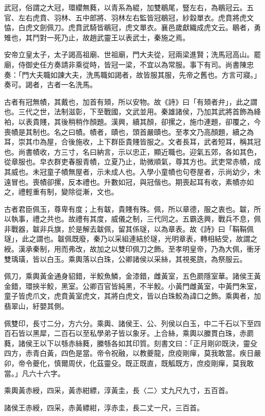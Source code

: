 \begin{pinyinscope}
武冠，俗謂之大冠，環纓無蕤，以青系為緄，加雙鶡尾，豎左右，為鶡冠云。五官、左右虎賁、羽林、五中郎將、羽林左右監皆冠鶡冠，紗縠單衣。虎賁將虎文恊，白虎文劍佩刀。虎賁武騎皆鶡冠，虎文單衣。襄邑歲獻織成虎文云。鶡者，勇雉也，其鬥對一死乃止，故趙武靈王以表武士，秦施之焉。

安帝立皇太子，太子謁高祖廟、世祖廟，門大夫從，冠兩梁進賢；洗馬冠高山。罷廟，侍御史任方奏請非乘從時，皆冠一梁，不宜以為常服。事下有司。尚書陳忠奏：「門大夫職如諫大夫，洗馬職如謁者，故皆服其服，先帝之舊也。方言可寢。」奏可。謁者，古者一名洗馬。

古者有冠無幘，其戴也，加首有頍，所以安物。故《詩》曰「有頍者弁」，此之謂也。三代之世，法制滋彰，下至戰國，文武並用。秦雄諸侯，乃加其武將首飾為絳袙，以表貴賤，其後稍稍作顏題。漢興，續其顏，卻摞之，施巾連題，卻覆之，今喪幘是其制也。名之曰幘。幘者，賾也，頭首嚴賾也。至孝文乃高顏題，續之為耳，崇其巾為屋，合後施收，上下群臣貴賤皆服之。文者長耳，武者短耳，稱其冠也。尚書幘收，方三寸，名曰納言，示以忠正，顯近職也。迎氣五郊，各如其色，從章服也。皁衣群吏春服青幘，立夏乃止，助微順氣，尊其方也。武吏常赤幘，成其威也。未冠童子幘無屋者，示未成人也。入學小童幘也句卷屋者，示尚幼少，未遠冒也。喪幘卻摞，反本禮也。升數如冠，與冠偕也。期喪起耳有收，素幘亦如之，禮輕重有制，變除從漸，文也。

古者君臣佩玉，尊卑有度；上有韍，貴賤有殊。佩，所以章德，服之衷也。韍，所以執事，禮之共也。故禮有其度，威儀之制，三代同之。五霸迭興，戰兵不息，佩非戰器，韍非兵旗，於是解去韍佩，留其係璲，以為章表。故《詩》曰「鞙鞙佩璲」，此之謂也。韍佩既廢，秦乃以采組連結於璲，光明章表，轉相結受，故謂之綬。漢承秦制，用而弗改，故加之以雙印佩刀之飾。至孝明皇帝，乃為大佩，衝牙雙瑀璜，皆以白玉。乘輿落以白珠，公卿諸侯以采絲，其視冕旒，為祭服云。

佩刀，乘輿黃金通身貂錯，半鮫魚鱗，金漆錯，雌黃室，五色罽隱室華。諸侯王黃金錯，環挾半鮫，黑室。公卿百官皆純黑，不半鮫。小黃門雌黃室，中黃門朱室，童子皆虎爪文，虎賁黃室虎文，其將白虎文，皆以白珠鮫為諱口之飾。乘輿者，加翡翠山，紆嬰其側。

佩雙印，長寸二分，方六分。乘輿、諸侯王、公、列侯以白玉，中二千石以下至四百石皆以黑犀，二百石以至私學弟子皆以象牙。上合絲，乘輿以縢貫白珠，赤罽蕤，諸侯王以下以綔赤絲蕤，縢綔各如其印質。刻書文曰：「正月剛卯既決，靈殳四方，赤青白黃，四色是當。帝令祝融，以教夔龍，庶疫剛癉，莫我敢當。疾日嚴卯，帝令夔化，慎爾周伏，化茲靈殳。既正既直，既觚既方，庶疫剛癉，莫我敢當。」凡六十六字。

乘輿黃赤綬，四采，黃赤紺縹，淳黃圭，長〈二〉丈九尺九寸，五百首。

諸侯王赤綬，四采，赤黃縹紺，淳赤圭，長二丈一尺，三百首。


\end{pinyinscope}
